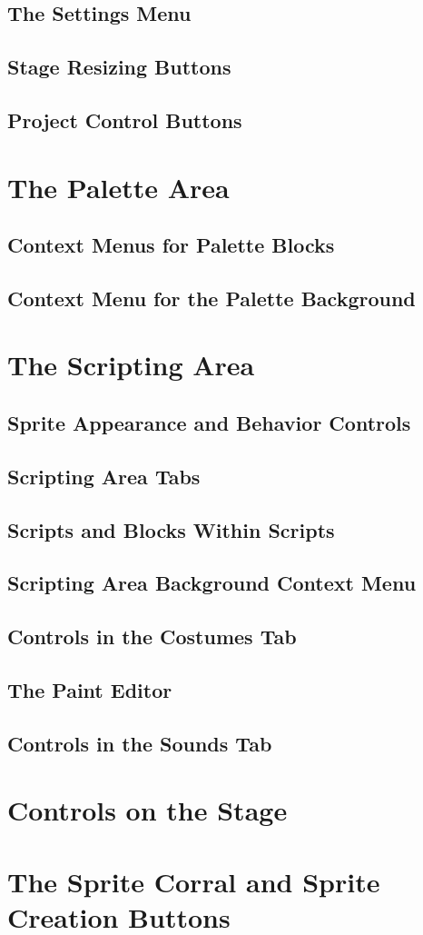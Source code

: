 \documentclass{report}
\begin{document}
\subsection{The Settings Menu}
\subsection{Stage Resizing Buttons}
\subsection{Project Control Buttons}
\section{The Palette Area}
\subsection{Context Menus for Palette Blocks}
\subsection{Context Menu for the Palette Background}
\section{The Scripting Area}
\subsection{Sprite Appearance and Behavior Controls}
\subsection{Scripting Area Tabs}
\subsection{Scripts and Blocks Within Scripts}
\subsection{Scripting Area Background Context Menu}
\subsection{Controls in the Costumes Tab}
\subsection{The Paint Editor}
\subsection{Controls in the Sounds Tab}
\section{Controls on the Stage}
\section{The Sprite Corral and Sprite Creation Buttons}
\end{document}
